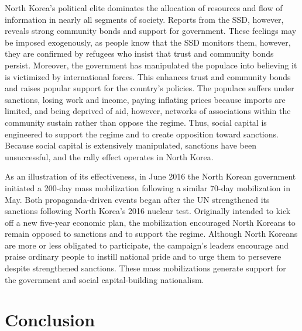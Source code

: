 \documentclass[12pt,]{article}
\begin{document}
North Korea's political elite dominates the allocation of resources and
flow of information in nearly all segments of society. Reports from the
SSD, however, reveals strong community bonds and support for government.
These feelings may be imposed exogenously, as people know that the SSD
monitors them, however, they are confirmed by refugees who insist that
trust and community bonds persist. Moreover, the government has
manipulated the populace into believing it is victimized by
international forces. This enhances trust and community bonds and raises
popular support for the country's policies. The populace suffers under
sanctions, losing work and income, paying inflating prices because
imports are limited, and being deprived of aid, however, networks of
associations within the community sustain rather than oppose the regime.
Thus, social capital is engineered to support the regime and to create
opposition toward sanctions. Because social capital is extensively
manipulated, sanctions have been unsuccessful, and the rally effect
operates in North Korea.

As an illustration of its effectiveness, in June 2016 the North Korean
government initiated a 200-day mass mobilization following a similar
70-day mobilization in May. Both propaganda-driven events began after
the UN strengthened its sanctions following North Korea's 2016 nuclear
test. Originally intended to kick off a new five-year economic plan, the
mobilization encouraged North Koreans to remain opposed to sanctions and
to support the regime. Although North Koreans are more or less obligated
to participate, the campaign's leaders encourage and praise ordinary
people to instill national pride and to urge them to persevere despite
strengthened sanctions. These mass mobilizations generate support for
the government and social capital-building nationalism.

\hypertarget{conclusion}{%
\section{Conclusion}\label{conclusion}}
\end{document}

